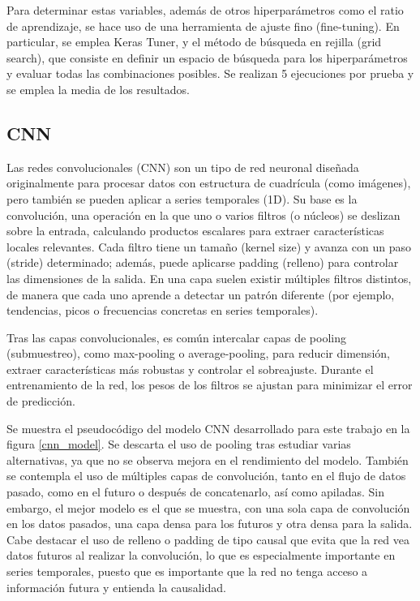 Para determinar estas variables, además de otros hiperparámetros como el ratio de aprendizaje, se hace uso de una herramienta de ajuste fino (fine-tuning). En particular, se emplea Keras Tuner, y el método de búsqueda
en rejilla (grid search), que consiste en definir un espacio de búsqueda para los hiperparámetros y evaluar todas las combinaciones posibles. Se realizan 5 ejecuciones por prueba y se 
emplea la media de los resultados.

\subsection{CNN}
Las redes convolucionales (CNN) son un tipo de red neuronal diseñada originalmente para procesar datos con estructura de cuadrícula (como imágenes), pero también se pueden aplicar a series temporales (1D).
Su base es la convolución, una operación en la que uno o varios filtros (o núcleos) se deslizan sobre la entrada, calculando productos escalares para extraer características locales relevantes.
Cada filtro tiene un tamaño (kernel size) y avanza con un paso (stride) determinado; además, puede aplicarse padding (relleno) para controlar las dimensiones de la salida.
En una capa suelen existir múltiples filtros distintos, de manera que cada uno aprende a detectar un patrón diferente (por ejemplo, tendencias, picos o frecuencias concretas en series temporales).

Tras las capas convolucionales, es común intercalar capas de pooling (submuestreo), como max-pooling o average-pooling, para reducir dimensión, extraer características más robustas y controlar el sobreajuste.
Durante el entrenamiento de la red, los pesos de los filtros se ajustan para minimizar el error de predicción.

Se muestra el pseudocódigo del modelo CNN desarrollado para este trabajo en la figura \ref{cnn_model}. Se descarta el uso de pooling tras estudiar varias alternativas, ya que no se observa mejora en 
el rendimiento del modelo. También se contempla el uso de múltiples capas de convolución, tanto en el flujo de datos pasado, como en el futuro o después de concatenarlo, así como apiladas. 
Sin embargo, el mejor modelo es el que se muestra, con una sola capa de convolución en los datos pasados, una capa densa para los futuros y otra densa para la salida.
Cabe destacar el uso de relleno o padding de tipo causal que evita que la red vea datos futuros al realizar la convolución, lo que es especialmente importante en series temporales, puesto que es 
importante que la red no tenga acceso a información futura y entienda la causalidad.

